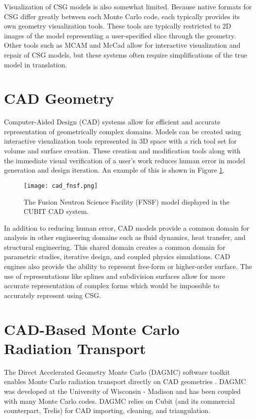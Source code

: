 Visualization of CSG models is also somewhat limited. Because native formats for
CSG differ greatly between each Monte Carlo code, each typically provides its
own geometry visualization tools. These tools are typically restricted to 2D
images of the model representing a user-specified slice through the
geometry. Other tools such as MCAM \cite{Liu_2005} and McCad
\cite{Tsigetamirat_2008} allow for interactive visualization and repair of CSG
models, but these systems often require simplifications of the true model in
translation.

\section{CAD Geometry}

Computer-Aided Design (CAD) systems allow for efficient and accurate representation of geometrically
complex domains. Models can be created using interactive visualization tools
represented in 3D space with a rich tool set for volume and surface
creation. These creation and modification tools along with the immediate visual
verification of a user's work reduces human error in model generation and design
iteration. An example of this is shown in Figure \ref{fig:cad_fnsf}.

\begin{figure}[H]
  \centering
  \texttt{[image: cad\_fnsf.png]}
  \caption{The Fusion Neutron Science Facility (FNSF)\cite{Kessel_2017} model
    displayed in the CUBIT \cite{Blacker_1994} CAD system.}
  \label{fig:cad_fnsf}
\end{figure}

In addition to reducing human error, CAD models provide a common domain for
analysis in other engineering domains such as fluid dynamics, heat transfer, and
structural engineering. This shared domain creates a common domain for
parametric studies, iterative design, and coupled physics simulations. CAD
engines also provide the ability to represent free-form or higher-order
surface. The use of representations like splines and subdivision surfaces allow
for more accurate representation of complex forms which would be impossible to
accurately represent using CSG.

\section{CAD-Based Monte Carlo Radiation Transport}

The Direct Accelerated Geometry Monte Carlo (DAGMC) software toolkit enables
Monte Carlo radiation transport directly on CAD geometries
\cite{Tautges_2009}. DAGMC was developed at the University of Wisconsin -
Madison and has been coupled with many Monte Carlo codes. DAGMC relies on
Cubit\cite{Blacker_1994} (and its commercial counterpart, Trelis) for CAD
importing, cleaning, and triangulation.

